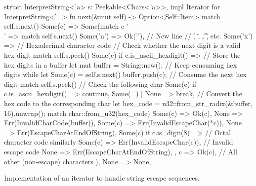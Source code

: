 \documentclass[../00-main.tex]{subfiles}
\begin{document}
\begin{listing}[t]
  \begin{RustListing}
    struct InterpretString<'a> {
        s: Peekable<Chars<'a>>,
    }
    impl Iterator for InterpretString<'_> {
        fn next(&mut self) -> Option<Self::Item> {
            match self.s.next() {
                Some(c) => Some(match c {
                    '\\' => match self.s.next() {
                        Some('n') => Ok('\n'),  // New line
                        // \', \", \t, \r, etc.
                        Some('x') => { // Hexadecimal character code
                            // Check whether the next digit is a valid hex digit
                            match self.s.peek() {
                                Some(c) if c.is_ascii_hexdigit() => {
                                    // Store the hex digits in a buffer
                                    let mut buffer = String::new();
                                    // Keep consuming hex digits
                                    while let Some(c) = self.s.next() {
                                        buffer.push(c); // Consume the next hex digit
                                        match self.s.peek() { // Check the following char
                                            Some(c) if c.is_ascii_hexdigit() => continue,
                                            Some(_) | None => break,
                                        }
                                    }
                                    // Convert the hex code to the corresponding char
                                    let hex_code = u32::from_str_radix(&buffer, 16).unwrap();
                                    match char::from_u32(hex_code) {
                                        Some(c) => Ok(c),
                                        None => Err(InvalidCharCode(buffer)),
                                    }
                                }
                                Some(c) => Err(InvalidEscapeChar(*c)),
                                None => Err(EscapeCharAtEndOfString),
                            }
                        }
                        Some(c) if c.is_digit(8) => {} // Octal character code similarly
                        Some(c) => Err(InvalidEscapeChar(c)), // Invalid escape code
                        None => Err(EscapeCharAtEndOfString),
                    },
                    c => Ok(c), // All other (non-escape) characters
                }),
                None => None,
            }
        }
    }
  \end{RustListing}
  \caption{Implementation of an iterator to handle string escape sequences.}
  \label{app:lst:string escape iterator}
\end{listing}
\end{document}
